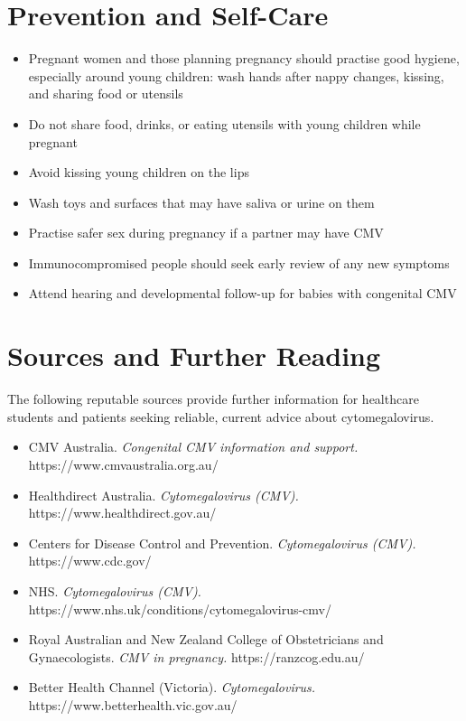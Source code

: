 \section*{Prevention and Self-Care}
\begin{itemize}
    \item Pregnant women and those planning pregnancy should practise good hygiene, especially around young children: wash hands after nappy changes, kissing, and sharing food or utensils
    \item Do not share food, drinks, or eating utensils with young children while pregnant
    \item Avoid kissing young children on the lips
    \item Wash toys and surfaces that may have saliva or urine on them
    \item Practise safer sex during pregnancy if a partner may have CMV
    \item Immunocompromised people should seek early review of any new symptoms
    \item Attend hearing and developmental follow-up for babies with congenital CMV
\end{itemize}

\section*{Sources and Further Reading}
The following reputable sources provide further information for healthcare students and patients seeking reliable, current advice about cytomegalovirus.

\begin{itemize}
    \item CMV Australia. \textit{Congenital CMV information and support.} https://www.cmvaustralia.org.au/
    \item Healthdirect Australia. \textit{Cytomegalovirus (CMV).} https://www.healthdirect.gov.au/
    \item Centers for Disease Control and Prevention. \textit{Cytomegalovirus (CMV).} https://www.cdc.gov/
    \item NHS. \textit{Cytomegalovirus (CMV).} https://www.nhs.uk/conditions/cytomegalovirus-cmv/
    \item Royal Australian and New Zealand College of Obstetricians and Gynaecologists. \textit{CMV in pregnancy.} https://ranzcog.edu.au/
    \item Better Health Channel (Victoria). \textit{Cytomegalovirus.} https://www.betterhealth.vic.gov.au/
\end{itemize}
